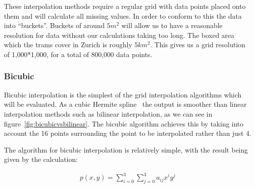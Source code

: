         These interpolation methods require a regular grid with data points placed onto them and will calculate all missing values. In order to conform to this the data into ``buckets''. Buckets of around $5m^{2}$ will allow us to have a reasonable resolution for data without our calculations taking too long. The boxed area which the trams cover in Zurich is roughly $5km^{2}$. This gives us a grid resolution of 1,000*1,000, for a total of 800,000 data points. 

        \subsubsection{Bicubic}\label{background_interpolation_methods_bicubic}

            Bicubic interpolation is the simplest of the grid interpolation algorithms which will be evaluated. As a cubic Hermite spline~\cite{practicalguidesplines} the output is smoother than linear interpolation methods such as bilinear interpolation, as we can see in figure~\ref{fig:bicubicvsbilinear}. The bicubic algorithm achieves this by taking into account the 16 points surrounding the point to be interpolated rather than just 4. 


            The algorithm for bicubic interpolation is relatively simple, with the result being given by the calculation:

            \begin{align*}
                p(x,y) = \sum_{i=0}^{3}{\sum_{j=0}^{3}{a_{ij}x^{i}y^{j}}}
            \end{align*}

        
        
